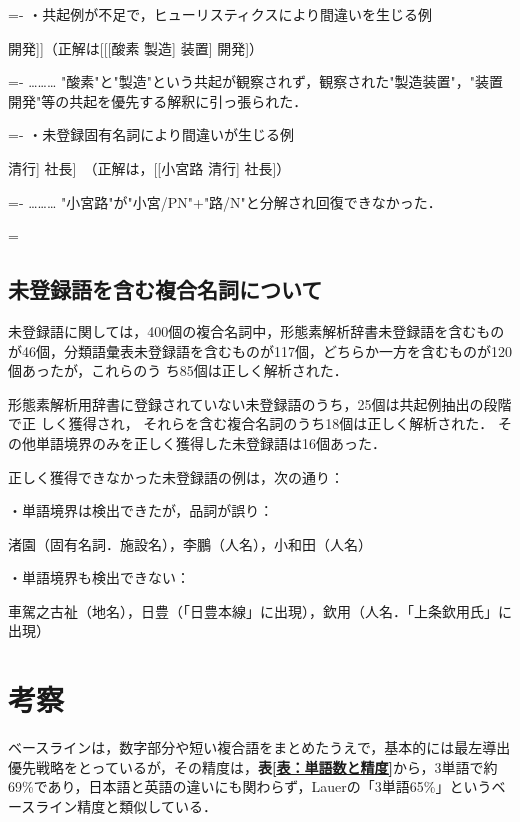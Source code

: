 \settowidth{\leftskip}{・}
\settowidth{\parindent}{・}
\parindent=-\parindent
・共起例が不足で，ヒューリスティクスにより間違いを生じる例

\settowidth{\leftskip}{・}
\noindent
[酸素 [[製造 装置] 開発]]（正解は[[[酸素 製造] 装置] 開発]）

\settowidth{\leftskip}{・[[改正……}
\settowidth{\parindent}{………\ }
\parindent=-\parindent
……… "酸素"と"製造"という共起が観察されず，観察された"製造装置"，"装置開発"等の共起を優先する解釈に引っ張られた．

\settowidth{\leftskip}{・}
\settowidth{\parindent}{・}
\parindent=-\parindent
・未登録固有名詞により間違いが生じる例

\settowidth{\leftskip}{・}
\noindent
[[[小宮 路] 清行] 社長]　（正解は，[[小宮路 清行] 社長]）

\settowidth{\leftskip}{・[[改正……}
\settowidth{\parindent}{………\ }
\parindent=-\parindent
……… "小宮路"が"小宮/PN"+"路/N"と分解され回復できなかった．

\parindent=\originalparindent
\leftskip=0mm

\subsection{未登録語を含む複合名詞について}\label{未登録語を含む複合名詞について}
未登録語に関しては，400個の複合名詞中，形態素解析辞書未登録語を含むものが46個，分類語彙表未登録語を含むものが117個，どちらか一方を含むものが120個あったが，これらのう\break
ち85個は正しく解析された．

形態素解析用辞書に登録されていない未登録語のうち，25個は共起例抽出の段階で正
しく獲得され，
それらを含む複合名詞のうち18個は正しく解析された．
その他単語境界のみを正しく獲得した未登録語は16個あった．

正しく獲得できなかった未登録語の例は，次の通り：

\noindent
・単語境界は検出できたが，品詞が誤り：

\settowidth{\leftskip}{・単語}
\noindent
渚園（固有名詞．施設名），李鵬（人名），小和田（人名）

\leftskip=0mm

\noindent
・単語境界も検出できない：

\settowidth{\leftskip}{・単語}
\noindent
車駕之古祉（地名），日豊（「日豊本線」に出現），欽用（人名．「上条欽用氏」に出現）

\leftskip=0mm

\section{考察}\label{考察}
ベースラインは，数字部分や短い複合語をまとめたうえで，基本的には最左導出優先戦略をとっているが，その精度は，{\bf 表\ref{表：単語数と精度}}から，3単語で約69\%であり，日本語と英語の違いにも関わらず，Lauerの「3単語65\%」\cite{Lauer1995}というベースライン精度と類似している．

